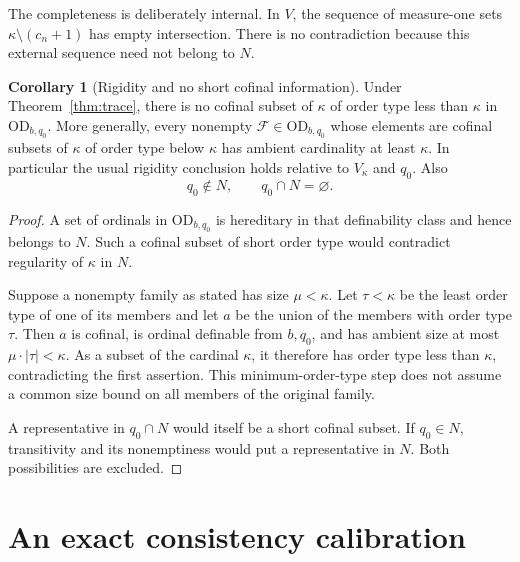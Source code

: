 \documentclass[11pt,letterpaper]{article}
\theoremstyle{definition}
\newtheorem{corollary}[definition]{Corollary}
\numberwithin{equation}{section}
\newcommand{\OD}{\mathrm{OD}}
\newcommand{\FFam}{\mathscr F}
\begin{document}
The completeness is deliberately internal. In $V$, the sequence of measure-one sets
$\kappa\setminus(c_n+1)$ has empty intersection. There is no contradiction because this external sequence need not belong to $N$.

\begin{corollary}[Rigidity and no short cofinal information]\label{cor:rigidity}
Under Theorem~\ref{thm:trace}, there is no cofinal subset of $\kappa$ of order type less than $\kappa$ in $\OD_{b,q_0}$. More generally, every nonempty $\FFam\in\OD_{b,q_0}$ whose elements are cofinal subsets of $\kappa$ of order type below $\kappa$ has ambient cardinality at least $\kappa$. In particular the usual rigidity conclusion holds relative to $V_\kappa$ and $q_0$. Also
\[
 q_0\notin N,\qquad q_0\cap N=\varnothing.
\]
\end{corollary}

\begin{proof}
A set of ordinals in $\OD_{b,q_0}$ is hereditary in that definability class and hence belongs to $N$. Such a cofinal subset of short order type would contradict regularity of $\kappa$ in $N$.

Suppose a nonempty family as stated has size $\mu<\kappa$. Let $\tau<\kappa$ be the least order type of one of its members and let $a$ be the union of the members with order type $\tau$. Then $a$ is cofinal, is ordinal definable from $b,q_0$, and has ambient size at most $\mu\cdot|\tau|<\kappa$. As a subset of the cardinal $\kappa$, it therefore has order type less than $\kappa$, contradicting the first assertion. This minimum-order-type step does not assume a common size bound on all members of the original family.

A representative in $q_0\cap N$ would itself be a short cofinal subset. If $q_0\in N$, transitivity and its nonemptiness would put a representative in $N$. Both possibilities are excluded.
\end{proof}

\section{An exact consistency calibration}\label{sec:consistency}
\end{document}
